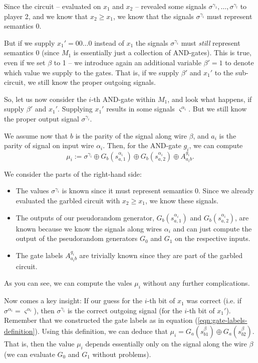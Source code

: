 Since the circuit -- evaluated on $x_1$ and $x_2$ -- revealed some signals $\sigma^{\gamma_1},\dots,\sigma^{\gamma_l}$ to player 2, and we know that $x_2\geq x_1$, we know that the signals $\sigma^{\gamma_i}$ must represent semantics 0.

But if we supply $x_1'=00\dots 0$ instead of $x_1$ the signals $\sigma^{\gamma_i}$ must \emph{still} represent semantics 0 (since $M_1$ is essentially just a collection of AND-gates). This is true, even if we set $\beta$ to 1 -- we introduce again an additional variable $\beta'=1$ to denote which value we supply to the gates. That is, if we supply $\beta'$ and $x_1'$ to the sub-circuit, we still know the proper outgoing signals.

So, let us now consider the $i$-th AND-gate within $M_1$, and look what happens, if supply $\beta'$ and $x_1'$. Supplying $x_1'$ results in some signals $\varsigma^{\alpha_i}$. But we still know the proper output signal $\sigma^{\gamma_i}$.

We assume now that $b$ is the parity of the signal along wire $\beta$, and $a_i$ is the parity of signal on input wire $\alpha_i$. Then, for the AND-gate $g_i$, we can compute 
\begin{equation}
  \label{eq:mu_i-is-a-tricky-thing}
  \mu_i:=\sigma^{\gamma_i}\oplus G_b(s^{\alpha_i}_{a,1}) \oplus G_b(s^{\alpha_i}_{a,2}) \oplus A^{g_i}_{a_i b}.
\end{equation}

We consider the parts of the right-hand side:

\begin{itemize}
\item The values $\sigma^{\gamma_i}$ is known since it must represent semantics 0. Since we already evaluated the garbled circuit with $x_2\geq x_1$, we know these signals.
\item The outputs of our pseudorandom generator, $G_b(s^{\alpha_i}_{a,1})$ and $G_b(s^{\alpha_i}_{a,2})$, are known because we know the signals along wires $\alpha_i$ and can just compute the output of the pseudorandom generators $G_0$ and $G_1$ on the respective inputs.
\item The gate labels $A^{g_i}_{a_i b}$ are trivially known since they are part of the garbled circuit.
\end{itemize}

As you can see, we can compute the vales $\mu_i$ without any further complications.

Now comes a key insight: If our guess for the $i$-th bit of $x_1$ was correct (i.e. if $\sigma^{\alpha_i} = \varsigma^{\alpha_i}$), then $\sigma^{\gamma_i}$ is the correct outgoing signal (for the $i$-th bit of $x_1'$). Remember that we constructed the gate labels as in equation (\ref{eqn:gate-labels-definition}). Using this definition, we can deduce that $\mu_i=G_a(s^\beta_{b1})\oplus G_a(s^\beta_{b2})$. That is, then the value $\mu_i$ depends essentially only on the signal along the wire $\beta$ (we can evaluate $G_0$ and $G_1$ without problems).

